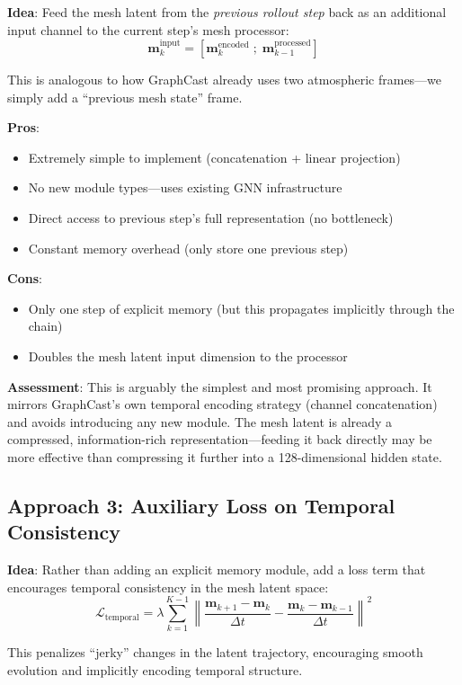 \documentclass[11pt,a4paper]{article}
\begin{document}
\textbf{Idea}: Feed the mesh latent from the \emph{previous rollout step} back as an additional input channel to the current step's mesh processor:
\[
\mathbf{m}_k^\text{input} = [\mathbf{m}_k^\text{encoded} \;;\; \mathbf{m}_{k-1}^\text{processed}]
\]

This is analogous to how GraphCast already uses two atmospheric frames---we simply add a ``previous mesh state'' frame.

\textbf{Pros}:
\begin{itemize}[nosep]
  \item Extremely simple to implement (concatenation + linear projection)
  \item No new module types---uses existing GNN infrastructure
  \item Direct access to previous step's full representation (no bottleneck)
  \item Constant memory overhead (only store one previous step)
\end{itemize}

\textbf{Cons}:
\begin{itemize}[nosep]
  \item Only one step of explicit memory (but this propagates implicitly through the chain)
  \item Doubles the mesh latent input dimension to the processor
\end{itemize}

\textbf{Assessment}: This is arguably the simplest and most promising approach. It mirrors GraphCast's own temporal encoding strategy (channel concatenation) and avoids introducing any new module. The mesh latent is already a compressed, information-rich representation---feeding it back directly may be more effective than compressing it further into a 128-dimensional hidden state.

\subsection{Approach 3: Auxiliary Loss on Temporal Consistency}

\textbf{Idea}: Rather than adding an explicit memory module, add a loss term that encourages temporal consistency in the mesh latent space:
\[
\mathcal{L}_\text{temporal} = \lambda \sum_{k=1}^{K-1} \left\| \frac{\mathbf{m}_{k+1} - \mathbf{m}_k}{\Delta t} - \frac{\mathbf{m}_k - \mathbf{m}_{k-1}}{\Delta t} \right\|^2
\]

This penalizes ``jerky'' changes in the latent trajectory, encouraging smooth evolution and implicitly encoding temporal structure.
\end{document}
